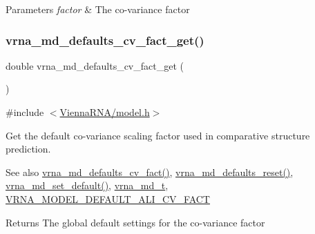 \begin{DoxyParams}{Parameters}
{\em factor} & The co-\/variance factor \\
\hline
\end{DoxyParams}
\mbox{\label{group__model__details_gae59c68393807217b0a2497adb64d3ee3}} 
\subsubsection{\texorpdfstring{vrna\+\_\+md\+\_\+defaults\+\_\+cv\+\_\+fact\+\_\+get()}{vrna\_md\_defaults\_cv\_fact\_get()}}
{\footnotesize\ttfamily double vrna\+\_\+md\+\_\+defaults\+\_\+cv\+\_\+fact\+\_\+get (\begin{DoxyParamCaption}\item[{void}]{ }\end{DoxyParamCaption})}



{\ttfamily \#include $<$\mbox{\hyperlink{model_8h}{Vienna\+R\+N\+A/model.\+h}}$>$}



Get the default co-\/variance scaling factor used in comparative structure prediction. 

\begin{DoxySeeAlso}{See also}
\mbox{\hyperlink{group__model__details_gad3a3f40baafd91a6ce80a91a68e20053}{vrna\+\_\+md\+\_\+defaults\+\_\+cv\+\_\+fact()}}, \mbox{\hyperlink{group__model__details_ga70834424cf804d149937de89f80ceb45}{vrna\+\_\+md\+\_\+defaults\+\_\+reset()}}, \mbox{\hyperlink{group__model__details_ga8ac6ff84936282436f822644bf841f66}{vrna\+\_\+md\+\_\+set\+\_\+default()}}, \mbox{\hyperlink{group__model__details_ga1f8a10e12a0a1915f2a4eff0b28ea17c}{vrna\+\_\+md\+\_\+t}}, \mbox{\hyperlink{group__model__details_gaaaf3d73d6abc18d3889676952bfedb96}{V\+R\+N\+A\+\_\+\+M\+O\+D\+E\+L\+\_\+\+D\+E\+F\+A\+U\+L\+T\+\_\+\+A\+L\+I\+\_\+\+C\+V\+\_\+\+F\+A\+CT}} 
\end{DoxySeeAlso}
\begin{DoxyReturn}{Returns}
The global default settings for the co-\/variance factor 
\end{DoxyReturn}
\mbox{\label{group__model__details_gac35e596c850dce3ad55c49119fd7d471}} 
